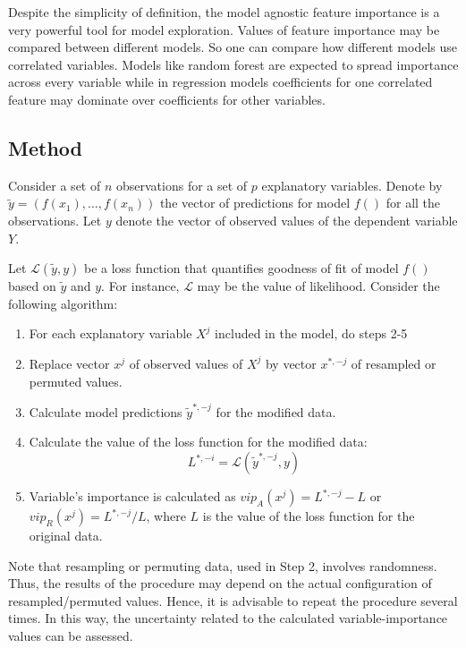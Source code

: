 \documentclass[12pt,]{krantz}
\providecommand{\tightlist}{%
  \setlength{\itemsep}{0pt}\setlength{\parskip}{0pt}}
\begin{document}
Despite the simplicity of definition, the model agnostic feature importance is a very powerful tool for model exploration. Values of feature importance may be compared between different models. So one can compare how different models use correlated variables. Models like random forest are expected to spread importance across every variable while in regression models coefficients for one correlated feature may dominate over coefficients for other variables.

\hypertarget{featureImportanceMethod}{%
\subsection{Method}\label{featureImportanceMethod}}

Consider a set of \(n\) observations for a set of \(p\) explanatory variables. Denote by \(\widetilde{y}=(f(x_1),\ldots,f(x_n))\) the vector of predictions for model \(f()\) for all the observations. Let \(y\) denote the vector of observed values of the dependent variable \(Y\).

Let \(\mathcal L(\widetilde{y}, y)\) be a loss function that quantifies goodness of fit of model \(f()\) based on \(\widetilde{y}\) and \(y\). For instance, \(\mathcal L\) may be the value of likelihood. Consider the following algorithm:

\begin{enumerate}
\def\labelenumi{\arabic{enumi}.}
\tightlist
\item
  For each explanatory variable \(X^j\) included in the model, do steps 2-5
\item
  Replace vector \(x^j\) of observed values of \(X^j\) by vector \(x^{*,-j}\) of resampled or permuted values.
\item
  Calculate model predictions \(\widetilde{y}^{*,-j}\) for the modified data.
\item
  Calculate the value of the loss function for the modified data:
  \[
  L^{*,-i} = \mathcal L(\widetilde{y}^{*,-j}, y)
  \]
\item
  Variable's importance is calculated as \(vip_A(x^j) = L^{*,-j} - L\) or \(vip_R(x^j) = L^{*,-j} / L\), where \(L\) is the value of the loss function for the original data.
\end{enumerate}

Note that resampling or permuting data, used in Step 2, involves randomness. Thus, the results of the procedure may depend on the actual configuration of resampled/permuted values. Hence, it is advisable to repeat the procedure several times. In this way, the uncertainty related to the calculated variable-importance values can be assessed.
\end{document}
